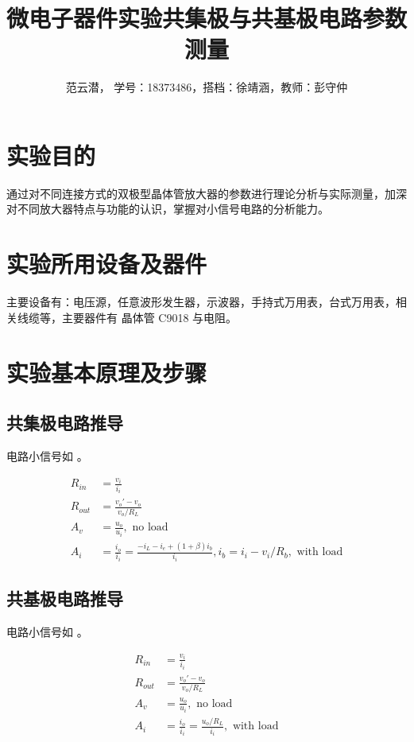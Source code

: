 \documentclass[lang=cn,11pt,a4paper,cite=authoryear]{elegantpaper}
\title{微电子器件实验\quad 共集极与共基极电路参数测量}
\author{范云潜， 学号：18373486，搭档：徐靖涵，教师：彭守仲}
\institute{微电子学院 184111 班}
\date{\zhtoday}
\begin{document}
\maketitle

\section{实验目的}

通过对不同连接方式的双极型晶体管放大器的参数进行理论分析与实际测量，加深对不同放大器特点与功能的认识，掌握对小信号电路的分析能力。

\section{实验所用设备及器件}

主要设备有：电压源，任意波形发生器，示波器，手持式万用表，台式万用表，相关线缆等，主要器件有 晶体管 C9018 与电阻。

\section{实验基本原理及步骤}

\subsection{共集极电路推导}

电路小信号如  。

\[\begin{aligned}
    R_{in} &= \frac{v_{i}}{i_{i}} \\ 
    R_{out} &= \frac{v_o' - v_o}{v_o / R_L} \\ 
    A_v &= \frac{u_o}{u_i}, \text{ no load} \\
    A_i &= \frac{i_o}{i_i} = \frac{- i_L - i_e + (1+\beta) i_b}{i_i}, i_b = i_{i} - v_i / R_b, \text{ with load}
\end{aligned}\] 


\subsection{共基极电路推导}


电路小信号如  。

\[\begin{aligned}
    R_{in} &= \frac{v_{i}}{i_{i}} \\ 
    R_{out} &= \frac{v_o' - v_o}{v_o / R_L} \\ 
    A_v &= \frac{u_o}{u_i}, \text{ no load} \\
    A_i &= \frac{i_o}{i_i} = \frac{u_o / R_L}{i_i} , \text{ with load}
\end{aligned}\] 
\end{document}
